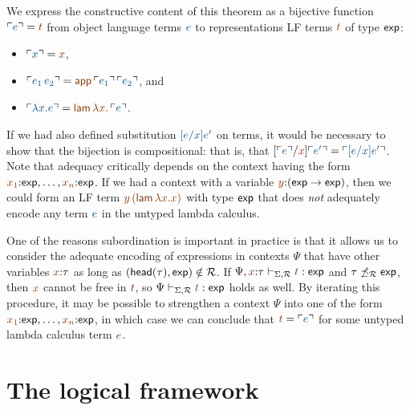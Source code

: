 We express the constructive content of this theorem as a bijective
function $\interp{e} = \lf{t}$ from object language terms $\obj{e}$ to
representations LF terms $\lf{t}$ of type ${\sf exp}$:
\smallskip
\begin{itemize}
\item $\interp{x} = \lf{x}$, 
\item $\interp{e_1\,e_2} = \lf{{\sf
    app}\,\interp{e_1}\,\interp{e_2}}$, and
\item  $\interp{\lambda x.e} =
\lf{{\sf lam}\,\lambda x.\,\interp{e}}$.
\end{itemize}
\smallskip If we had also defined
substitution $\obj{[e/x]e'}$ on terms, it would be necessary to show
that the bijection is compositional: that is, that
$[\interp{e}/\lf{x}]\interp{e'} = \interp{[e/x]e'}$.  Note that
adequacy critically depends on the context having the form
$\lf{x_1}{:}{\sf exp},\ldots,\lf{x_n}{:}{\sf exp}$. If we had a
context with a variable $\lf{y}{:}({\sf exp} \rightarrow {\sf exp})$,
then we could form an LF term $\lf{y\,({\sf lam}\,\lambda x. x)}$ with
type ${\sf exp}$ that does {\it not} adequately encode any term
$\obj{e}$ in the untyped lambda calculus.

One of the reasons subordination is important in practice is that it
allows us to consider the adequate encoding of expressions in contexts
$\Psi$ that have other variables $\lf{x}{:}\tau$ as long as $({\sf
  head}(\tau),{\sf exp}) \notin \mathcal R$. If $\Psi,\lf{x}{:}\tau
\vdash_{\Sigma,\subord} \lf{t} : {\sf exp}$ and $\tau
\not\preceq_\mathcal R {\sf exp}$, then $\lf{x}$ cannot be free in
$\lf{t}$, so $\Psi \vdash_{\Sigma,\subord} \lf{t} : {\sf exp}$ holds as
well. By iterating this procedure, it may be possible to strengthen a
context $\Psi$ into one of the form $\lf{x_1}{:}{\sf
  exp},\ldots,\lf{x_n}{:}{\sf exp}$, in which case we can conclude
that $\lf t = \interp{e}$ for some untyped lambda calculus term $\obj
e$.



\section{The logical framework \sls}
\label{sec:slsframework}

